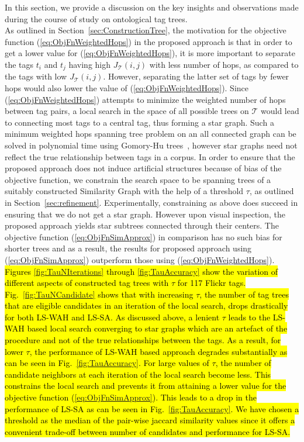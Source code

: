 In this section, we provide a discussion on the key insights and observations made during the course of study on ontological tag trees. \\
\indent As outlined in Section~\ref{sec:ConstructionTree}, the motivation for the objective function (\ref{eq:ObjFnWeightedHops})  in the proposed approach is that in order to get a lower value for (\ref{eq:ObjFnWeightedHops}), it is more important to separate the tags $t_i$ and $t_j$ having high $J_{\mathcal{T}}(i,j)$ with less number of hops, as compared to the tags with low $J_{\mathcal{T}}(i,j)$. However, separating the latter set of tags by fewer hops would also lower the value of  (\ref{eq:ObjFnWeightedHops}). Since (\ref{eq:ObjFnWeightedHops}) attempts to minimize the weighted number of hops between tag pairs, a local search in the space of all possible trees on $\mathcal{T}$ would lead to connecting most tags to a central tag, thus forming a star graph. Such a minimum weighted hops spanning tree problem on an all connected graph can be solved in polynomial time using Gomory-Hu trees~\cite{panigrahi2008gomory}, however star graphs need not reflect the true relationship between tags in a corpus. In order to ensure that the proposed approach does not induce artificial structures because of bias of the objective function, we constrain the search space to be spanning trees of a suitably constructed Similarity Graph with the help of a threshold $\tau$, as outlined in Section~\ref{sec:refinement}. Experimentally, constraining as above does succeed in ensuring that we do not get a star graph. However upon visual inspection, the proposed approach yields star subtrees connected through their centers.
The objective function (\ref{eq:ObjFnSimApprox}) in comparison has no such bias for shorter trees and as a result, the results for proposed approach using (\ref{eq:ObjFnSimApprox}) outperform those using (\ref{eq:ObjFnWeightedHops}). 
\hl{Figures {\ref{fig:TauNIterations}} through {\ref{fig:TauAccuracy}} show the variation of different aspects of constructed tag trees with $\tau$ for 117 Flickr tags. Fig.~{\ref{fig:TauNCandidate}} shows that with increasing $\tau$, the number of tag trees that are eligible candidates in an iteration of the local search, drops drastically for both LS-WAH and LS-SA. As discussed above, a lenient $\tau$ leads to the LS-WAH based local search converging to star graphs which are an artefact of the procedure and not of the true relationships between the tags. As a result, for lower $\tau$, the performance of LS-WAH based approach degrades substantially as can be seen in Fig.~{\ref{fig:TauAccuracy}}. For large values of $\tau$, the number of candidate neighbors at each iteration of the local search become less. This constrains the local search and prevents it from attaining a lower value for the objective function ({\ref{eq:ObjFnSimApprox}}). This leads to a drop in the performance of LS-SA as can be seen in Fig.~{\ref{fig:TauAccuracy}}. We have chosen a threshold as the median of the pair-wise jaccard similarity values since it offers a convenient trade-off between number of candidates and performance for LS-SA. } 

